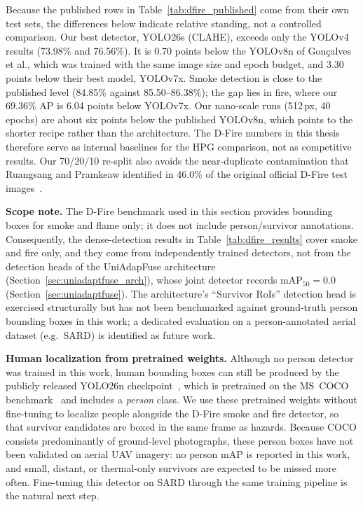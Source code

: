 Because the published rows in Table~\ref{tab:dfire_published} come from their own test sets, the differences below indicate relative standing, not a controlled comparison. Our best detector, YOLO26s (CLAHE), exceeds only the YOLOv4 results (73.98\% and 76.56\%). It is 0.70 points below the YOLOv8n of Gon{\c{c}}alves et al., which was trained with the same image size and epoch budget, and 3.30 points below their best model, YOLOv7x. Smoke detection is close to the published level (84.85\% against 85.50--86.38\%); the gap lies in fire, where our 69.36\% AP is 6.04 points below YOLOv7x. Our nano-scale runs (512\,px, 40 epochs) are about six points below the published YOLOv8n, which points to the shorter recipe rather than the architecture. The D-Fire numbers in this thesis therefore serve as internal baselines for the HPG comparison, not as competitive results. Our 70/20/10 re-split also avoids the near-duplicate contamination that Ruangsang and Pramkeaw identified in 46.0\% of the original official D-Fire test images~\cite{ruangsang2026crossdataset}.

\textbf{Scope note.} The D-Fire benchmark used in this section provides bounding boxes for smoke and flame only; it does not include person/survivor annotations. Consequently, the dense-detection results in Table~\ref{tab:dfire_results} cover smoke and fire only, and they come from independently trained detectors, not from the detection heads of the UniAdapFuse architecture (Section~\ref{sec:uniadaptfuse_arch}), whose joint detector records $\mathrm{mAP}_{50}=0.0$ (Section~\ref{sec:uniadaptfuse}). The architecture's ``Survivor RoIs'' detection head is exercised structurally but has not been benchmarked against ground-truth person bounding boxes in this work; a dedicated evaluation on a person-annotated aerial dataset (e.g.\ SARD) is identified as future work.

\textbf{Human localization from pretrained weights.} Although no person detector was trained in this work, human bounding boxes can still be produced by the publicly released YOLO26n checkpoint~\cite{sapkota2025yolo26}, which is pretrained on the MS~COCO benchmark~\cite{lin2014coco} and includes a \textit{person} class. We use these pretrained weights without fine-tuning to localize people alongside the D-Fire smoke and fire detector, so that survivor candidates are boxed in the same frame as hazards. Because COCO consists predominantly of ground-level photographs, these person boxes have not been validated on aerial UAV imagery: no person mAP is reported in this work, and small, distant, or thermal-only survivors are expected to be missed more often. Fine-tuning this detector on SARD through the same training pipeline is the natural next step.

